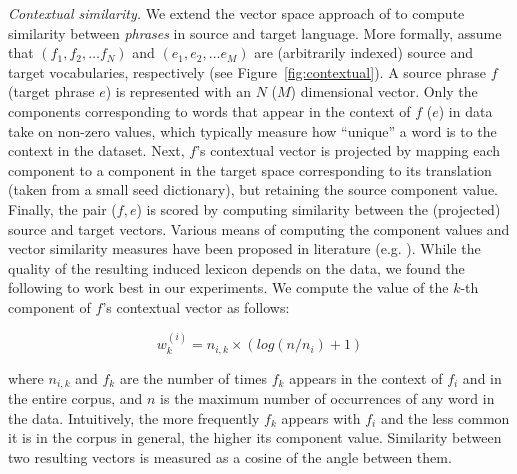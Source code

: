 \documentclass[11pt]{article}
\newcommand{\figref}[1]{Figure~\ref{#1}}
\begin{document}
\noindent\emph{Contextual similarity.}  We extend the vector space approach of \cite{Rapp:1999} to compute similarity between \emph{phrases} in source and target language.  More formally, assume that $(f_{1}, f_{2}, \dots f_{N})$ and $(e_{1}, e_{2}, \dots e_{M})$ are (arbitrarily indexed) source and target vocabularies, respectively (see \figref{fig:contextual}).  A source phrase $f$ (target phrase $e$) is represented with an $N$ ($M$) dimensional vector.  Only the components corresponding to words that appear in the context of $f$ ($e$) in data take on non-zero values, which typically measure how ``unique'' a word is to the context in the dataset.  Next, $f$'s contextual vector is projected by mapping each component to a component in the target space corresponding to its translation (taken from a small seed dictionary), but retaining the source component value.  Finally, the pair ($f, e$) is scored by computing similarity between the (projected) source and target vectors.  Various means of computing the component values and vector similarity measures have been proposed in literature (e.g. \cite{Rapp:1999,Fung:1998}).  While the quality of the resulting induced lexicon depends on the data, we found the following to work best in our experiments.  We compute the value of the $k$-th component of $f$'s contextual vector  as follows: 

\begin{equation*}
w_{k}^{(i)} = n_{i,k} \times (log( {n / n_{i}}) + 1)
\end{equation*}

\noindent where $n_{i,k}$ and $f_{k}$ are the number of times $f_{k}$ appears in the context of $f_{i}$ and in the entire corpus, and $n$ is the maximum number of occurrences of any word in the data.  Intuitively, the more frequently $f_{k}$ appears with $f_{i}$ and the less common it is in the corpus in general, the higher its component value.  Similarity between two resulting vectors is measured as a cosine of the angle between them.\\
\end{document}
